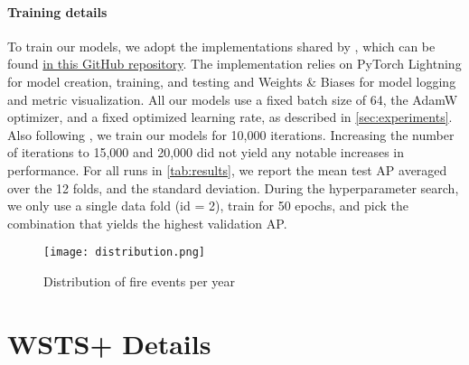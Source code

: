 \paragraph{Training details}
To train our models, we adopt the implementations shared by \cite{gerard2023wildfirespreadts}, which can be found \hyperlink{https://github.com/SebastianGer/WildfireSpreadTS/tree/main/src}{in this GitHub repository}. The implementation relies on PyTorch Lightning for model creation, training, and testing and Weights \& Biases for model logging and metric visualization. All our models use a fixed batch size of 64, the AdamW optimizer, and a fixed optimized learning rate, as described in \cref{sec:experiments}. Also following \cite{gerard2023wildfirespreadts}, we train our models for 10,000 iterations. Increasing the number of iterations to 15,000 and 20,000 did not yield any notable increases in performance.  For all runs in \cref{tab:results}, we report the mean test AP averaged over the 12 folds, and the standard deviation. During the hyperparameter search, we only use a single data fold (id = 2), train for 50 epochs, and pick the combination that yields the highest validation AP.

\begin{table}[]
    \centering
    \caption{Proposed cross-validation splits for WSTS+}
 
    \label{tab:my_label}
\end{table}

\begin{figure}
    \centering
    \texttt{[image: distribution.png]}
    \caption{Distribution of fire events per year }
    \label{fig:dist}
\end{figure}

\section{WSTS+ Details}

